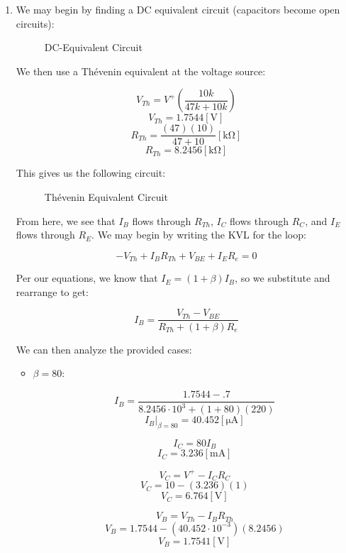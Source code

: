 \begin{enumerate}

  \item We may begin by finding a DC equivalent circuit (capacitors become open circuits):

    \begin{figure}[H]
      \centering
      
      \caption{DC-Equivalent Circuit}
      \label{fig:1}
    \end{figure}

    We then use a Th\'evenin equivalent at the voltage source:

    $$V_{Th}=V^+\left( \frac{10k}{47k+10k} \right)$$
    $$V_{Th}=1.7544[\si{\volt}]$$
    $$R_{Th}=\frac{(47)(10)}{47+10}[\si{\kilo\ohm}]$$
    $$R_{Th}=8.2456[\si{\kilo\ohm}]$$

    This gives us the following circuit:

    \begin{figure}[H]
      \centering
      
      \caption{Th\'evenin Equivalent Circuit}
      \label{fig:2}
    \end{figure}

    From here, we see that $I_B$ flows through $R_{Th}$, $I_C$ flows through $R_C$, and $I_E$ flows through $R_E$. We may begin by writing the KVL for the loop:

    $$-V_{Th}+I_{B}R_{Th}+V_{BE}+I_ER_e=0$$

    Per our equations, we know that $I_E=(1+\beta)I_B$, so we substitute and rearrange to get:

    $$I_B=\frac{V_{Th}-V_{BE}}{R_{Th}+(1+\beta)R_e}$$

    We can then analyze the provided cases:

    \begin{itemize}

      \item $\beta=80$:

        $$I_B=\frac{1.7544-.7}{8.2456\cdot10^3+(1+80)(220)}$$
        $$\boxed{I_B\Big|_{\beta=80}=40.452[\si{\micro\ampere}]}$$

        $$I_C=80I_B$$
        $$\boxed{I_C=3.236[\si{\milli\ampere}]}$$

        $$V_C=V^+-I_CR_C$$
        $$V_C=10-(3.236)(1)$$
        $$\boxed{V_C=6.764[\si{\volt}]}$$

        $$V_B=V_{Th}-I_BR_{Th}$$
        $$V_B=1.7544-(40.452\cdot10^{-3})(8.2456)$$
        $$\boxed{V_B=1.7541[\si{\volt}]}$$


\end{itemize}
\end{enumerate}
